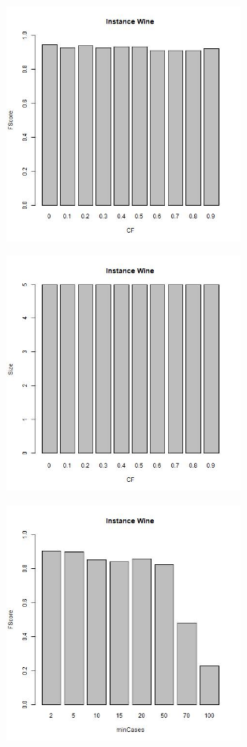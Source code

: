 \documentclass[12pt,a4paper]{article}
\begin{document}
\begin{figure}[H]
\centering
\includegraphics[width=0.7\textwidth]{WineFScoreCF.jpg}
\end{figure}

\begin{figure}[H]
\centering
\includegraphics[width=0.7\textwidth]{WineSizeCF.jpg}
\end{figure}

\begin{figure}[H]
\centering
\includegraphics[width=0.7\textwidth]{WineFScoreMinCases.jpg}
\end{figure}
\end{document}
